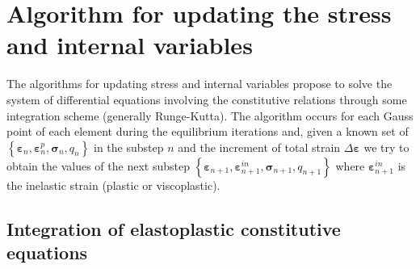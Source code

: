 \documentclass[Journal,letterpaper]{ascelike-new}
\newcommand{\Bll}{\boldsymbol B}
\newcommand{\Fl}{\boldsymbol{F}}
\newcommand{\Kll}{\boldsymbol K}
\newcommand{\Nll}{\boldsymbol N}
\newcommand{\Rl}{\boldsymbol{R}}
\newcommand{\strain}{\boldsymbol{\varepsilon}}
\newcommand{\stress}{\boldsymbol{\sigma}}
\newcommand{\ul}{\boldsymbol u}
\begin{document}
%

\section{Algorithm for updating the stress and internal variables}

The algorithms for updating stress and internal variables propose to solve the system of differential equations involving the constitutive relations through some integration scheme (generally Runge-Kutta). The algorithm occurs for each Gauss point of each element during the equilibrium iterations and, given a known set of $\left\{ \strain_n, \strain_n^p,\stress_n,q_n \right\}$ in the substep $n$ and the increment of total strain $\Delta \strain$ we try to obtain the values of the next substep $\left\{ \strain_{n+1}, \strain_{n+1}^{in},\stress_{n+1},q_{n+1} \right\}$ where $\strain_{n+1}^{in}$ is the inelastic strain (plastic or viscoplastic).

\subsection{Integration of elastoplastic constitutive equations}
\end{document}
